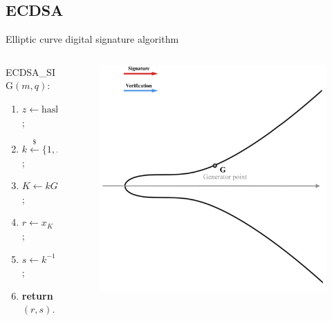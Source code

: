 \documentclass[slidescentered]{beamer}
\begin{document}
	\subsection{ECDSA}
	\begin{frame}{Elliptic curve digital signature algorithm}
		\begin{columns}
			\begin{column}{0.6\linewidth}
				ECDSA\_SIG$(m, q)$:
				\begin{enumerate}
					\item<3 -> $z \gets \text{hash}(m)$;
					\item<4 -> $k \xleftarrow{\text{\$}} \{1, ..., n - 1\}$;
					\item<5 -> $K \gets kG$;
					\item<6 -> $r \gets x_K \ (\text{mod} \ n)$;
					\item<7 -> $s \gets k^{-1}(z + rq) \ (\text{mod} \ n)$;
					\item<8 -> \textbf{return} $(r, s)$.
				\end{enumerate}
			\end{column}
			\begin{column}{0.5\linewidth}
				\begin{figure}
				 {\vspace*{-0.7cm}
					\hspace*{-1.7cm}
					\includegraphics[scale=0.29]{images/ECDSA1}
}
\end{figure}
\end{column}
\end{columns}
\end{frame}
\end{document}
